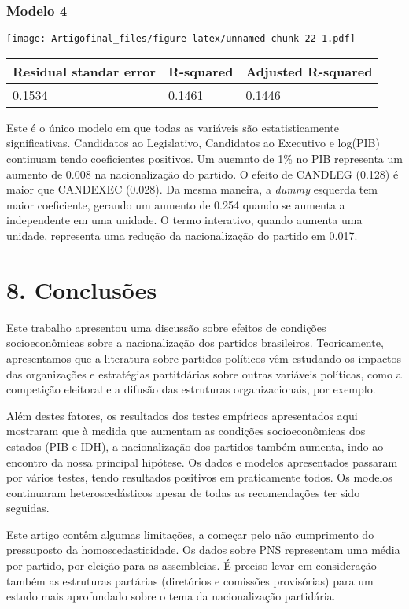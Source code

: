\documentclass[]{article}
\begin{document}
\newpage

\subsubsection{Modelo 4}\label{modelo-4}

\texttt{[image: Artigofinal\_files/figure-latex/unnamed-chunk-22-1.pdf]}

\begin{longtable}[]{@{}lll@{}}
\toprule
\textbf{Residual standar error} & \textbf{R-squared} & \textbf{Adjusted
R-squared}\tabularnewline
\midrule
\endhead
0.1534 & 0.1461 & 0.1446\tabularnewline
\bottomrule
\end{longtable}

Este é o único modelo em que todas as variáveis são estatisticamente
significativas. Candidatos ao Legislativo, Candidatos ao Executivo e
log(PIB) continuam tendo coeficientes positivos. Um auemnto de 1\% no
PIB representa um aumento de 0.008 na nacionalização do partido. O
efeito de CANDLEG (0.128) é maior que CANDEXEC (0.028). Da mesma
maneira, a \emph{dummy} esquerda tem maior coeficiente, gerando um
aumento de 0.254 quando se aumenta a independente em uma unidade. O
termo interativo, quando aumenta uma unidade, representa uma redução da
nacionalização do partido em 0.017.

\section{8. Conclusões}\label{conclusoes}

Este trabalho apresentou uma discussão sobre efeitos de condições
socioeconômicas sobre a nacionalização dos partidos brasileiros.
Teoricamente, apresentamos que a literatura sobre partidos políticos vêm
estudando os impactos das organizações e estratégias partitdárias sobre
outras variáveis políticas, como a competição eleitoral e a difusão das
estruturas organizacionais, por exemplo.

Além destes fatores, os resultados dos testes empíricos apresentados
aqui mostraram que à medida que aumentam as condições socioeconômicas
dos estados (PIB e IDH), a nacionalização dos partidos também aumenta,
indo ao encontro da nossa principal hipótese. Os dados e modelos
apresentados passaram por vários testes, tendo resultados positivos em
praticamente todos. Os modelos continuaram heteroscedásticos apesar de
todas as recomendações ter sido seguidas.

Este artigo contêm algumas limitações, a começar pelo não cumprimento do
pressuposto da homoscedasticidade. Os dados sobre PNS representam uma
média por partido, por eleição para as assembleias. É preciso levar em
consideração também as estruturas partárias (diretórios e comissões
provisórias) para um estudo mais aprofundado sobre o tema da
nacionalização partidária.
\end{document}
